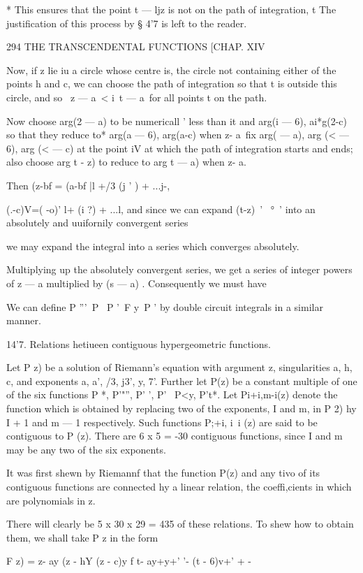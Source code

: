 * This ensures that the point t — ljz is not on the path of
integration, t The justification of this process by § 4'7 is left to
the reader.

294 THE TRANSCENDENTAL FUNCTIONS [CHAP. XIV

Now, if z lie iu a circle whose centre is, the circle not containing
either of the points h and c, we can choose the path of integration so
that t is outside this circle, and so \ z — a\ < i\ t — a\ for all
points t on the path.

Now choose arg(2 — a) to be numericall ' less than it and arg(i — 6),
ai*g(2-c) so that they reduce to* arg(a — 6), arg(a-c) when z- a\ fix
arg( — a), arg (< — 6), arg (< — c) at the point iV at which the path
of integration starts and ends; also choose arg t - z) to reduce to
arg t — a) when z- a.

Then (z-bf = (a-bf |l +/3 (j ' ) + ...j-,

(.-c)V=( -o)' l+ (i ?) + ...l, and since we can expand (t-z)~' ~°~'
into an absolutely and uuifornily convergent series

we may expand the integral into a series which converges absolutely.

Multiplying up the absolutely convergent series, we get a series of
integer powers of z — a multiplied by (s — a) . Consequently we must
have

We can define P '''\ P \ P '\ F y\ P ' by double circuit integrals in
a similar manner.

14'7. Relations hetiueen contiguous hypergeometric functions.

Let P z) be a solution of Riemann's equation with argument z,
singularities a, h, c, and exponents a, a', /3, j3', y, 7'. Further
let P(z) be a constant multiple of one of the six functions P *,
P'"'', P' ', P' \ P<y, P't*. Let Pi+i,m-i(z) denote the function
which is obtained by replacing two of the exponents, I and m, in P 2)
hy I + 1 and m — 1 respectively. Such functions P;+i, i\ i (z) are
said to be contiguous to P (z). There are 6 x 5 = -30 contiguous
functions, since I and m may be any two of the six exponents.

It was first shewn by Riemannf that the function P(z) and any tivo of
its contiguous functions are connected hy a linear relation, the
coeffi,cients in which are polynomials in z.

There will clearly be 5 x 30 x 29 = 435 of these relations. To shew
how to obtain them, we shall take P z in the form

F z) = z- ay (z - hY (z - c)y f t- ay+y+' '- (t - 6)v+' + -


